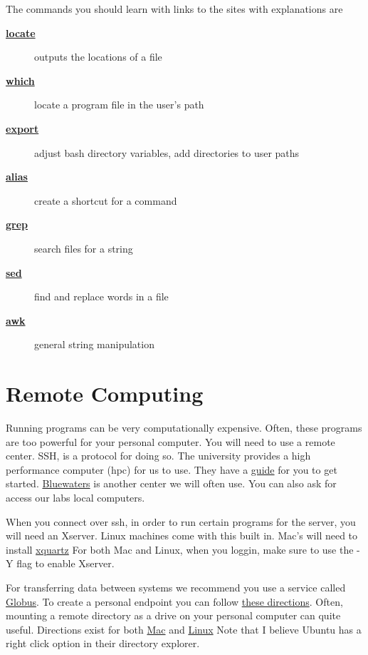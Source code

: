 \documentclass{article}
\begin{document}
The commands you should learn with links to the sites with explanations are

\begin{description}
  \item[\href{http://www.cyberciti.biz/faq/search-for-files-in-bash/}{\textbf{locate}}] outputs the locations of a file
  \item[\href{http://ss64.com/bash/which.html}{\textbf{which}}] locate a program file in the user's path
  \item[\href{http://www.cyberciti.biz/faq/linux-unix-shell-export-command/}{\textbf{export}}] adjust bash directory variables, add directories to user paths
  \item[\href{http://tldp.org/LDP/abs/html/aliases.html}{\textbf{alias}}] create a shortcut for a command
  \item[\href{http://www.panix.com/~elflord/unix/grep.html}{\textbf{grep}}] search files for a string
  \item[\href{http://www.grymoire.com/Unix/Sed.html}{\textbf{sed}}] find and replace words in a file
  \item[\href{http://www.grymoire.com/Unix/Awk.html}{\textbf{awk}}] general string manipulation
\end{description}

\section*{Remote Computing}
Running programs can be very computationally expensive. 
Often, these programs are too powerful for your personal computer.
You will need to use a remote center.
SSH, is a protocol for doing so.
The university provides a high performance computer (hpc) for us to use.
They have a \href{http://wiki.hpc.ufl.edu/doc/Getting\_Started}{guide} for you to get started.
\href{http://www.ncsa.illinois.edu/enabling/bluewaters}{Bluewaters} is another center we will often use.
You can also ask for access our labs local computers.

When you connect over ssh, in order to run certain programs for the server, you will need an Xserver.
Linux machines come with this built in.
Mac's will need to install \href{http://www.xquartz.org/}{xquartz}
For both Mac and Linux, when you loggin, make sure to use the -Y flag to enable Xserver.

For transferring data between systems we recommend you use a service called \href{https://www.globus.org/researchers/getting-started}{Globus}.
To create a personal endpoint you can follow \href{https://support.globus.org/entries/23881557}{these directions}.
Often, mounting a remote directory as a drive on your personal computer can quite useful.
Directions exist for both \href{http://www.macissues.com/2014/10/13/how-to-mount-a-remote-system-as-a-drive-using-ssh-in-os-x/}{Mac} and \href{http://www.cyberciti.biz/faq/how-to-mount-remote-directory-filesystems-with-sshfs-on-linux/}{Linux}
Note that I believe Ubuntu has a right click option in their directory explorer.
\end{document}

